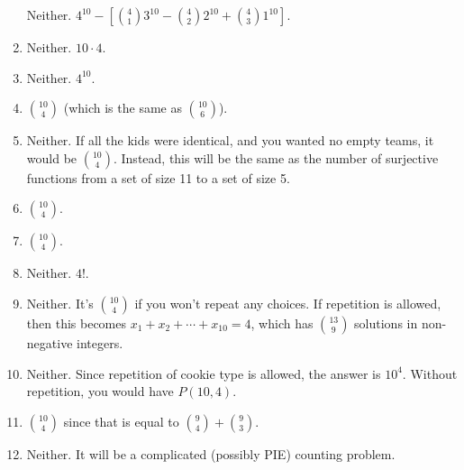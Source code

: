 \documentclass[10pt,]{book}
\theoremstyle{plain}
\theoremstyle{definition}
\theoremstyle{definition}
\theoremstyle{definition}
\numberwithin{equation}{section}
\begin{document}
\begin{exerciselist}
\begin{enumerate}[label=(\alph*)]
                  Neither. \(4^{10} - [{4\choose 1}3^{10} - {4\choose 2}2^{10} + {4 \choose 3}1^{10}]\).
\item\hypertarget{li-708}{}
                  Neither. \(10\cdot 4\).
\item\hypertarget{li-709}{}
                  Neither. \(4^{10}\).
\item\hypertarget{li-710}{}\({10 \choose 4}\) (which is the same as \({10 \choose 6}\)).%
\item\hypertarget{li-711}{}
                  Neither. If all the kids were identical, and you wanted no empty teams, it would be \({10 \choose 4}\). Instead, this will be the same as the number of surjective functions from a set of size 11 to a set of size 5.
\item\hypertarget{li-712}{}\({10 \choose 4}\).%
\item\hypertarget{li-713}{}\({10 \choose 4}\).%
\item\hypertarget{li-714}{}
                  Neither. \(4!\).
\item\hypertarget{li-715}{}
                  Neither. It's \({10 \choose 4}\) if you won't repeat any choices. If repetition is allowed, then this becomes \(x_1 + x_2 + \cdots +x_{10} = 4\), which has \({13 \choose 9}\) solutions in non-negative integers.
\item\hypertarget{li-716}{}
                  Neither. Since repetition of cookie type is allowed, the answer is \(10^4\). Without repetition, you would have \(P(10,4)\).
\item\hypertarget{li-717}{}\({10 \choose 4}\) since that is equal to \({9 \choose 4} + {9 \choose 3}\).%
\item\hypertarget{li-718}{}
                  Neither. It will be a complicated (possibly PIE) counting problem.
\end{enumerate}


\end{exerciselist}
\end{document}
